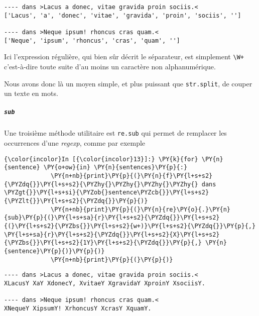     \begin{Verbatim}[commandchars=\\\{\},frame=single,framerule=0.3mm,rulecolor=\color{cellframecolor}]
---- dans >Lacus a donec, vitae gravida proin sociis.<
['Lacus', 'a', 'donec', 'vitae', 'gravida', 'proin', 'sociis', '']

---- dans >Neque ipsum! rhoncus cras quam.<
['Neque', 'ipsum', 'rhoncus', 'cras', 'quam', '']
\end{Verbatim}

    Ici l'expression régulière, qui bien sûr décrit le séparateur, est
simplement \texttt{\textbackslash{}W+} c'est-à-dire toute suite d'au
moins un caractère non alphanumérique.

Nous avons donc là un moyen simple, et plus puissant que
\texttt{str.split}, de couper un texte en mots.

    \hypertarget{sub}{%
\subparagraph{\texorpdfstring{\texttt{sub}}{sub}}\label{sub}}

    Une troisième méthode utilitaire est \texttt{re.sub} qui permet de
remplacer les occurrences d'une \emph{regexp}, comme par exemple

    \begin{Verbatim}[commandchars=\\\{\},frame=single,framerule=0.3mm,rulecolor=\color{cellframecolor}]
{\color{incolor}In [{\color{incolor}13}]:} \PY{k}{for} \PY{n}{sentence} \PY{o+ow}{in} \PY{n}{sentences}\PY{p}{:}
             \PY{n+nb}{print}\PY{p}{(}\PY{n}{f}\PY{l+s+s2}{\PYZdq{}}\PY{l+s+s2}{\PYZhy{}\PYZhy{}\PYZhy{}\PYZhy{} dans \PYZgt{}}\PY{l+s+si}{\PYZob{}sentence\PYZcb{}}\PY{l+s+s2}{\PYZlt{}}\PY{l+s+s2}{\PYZdq{}}\PY{p}{)}
             \PY{n+nb}{print}\PY{p}{(}\PY{n}{re}\PY{o}{.}\PY{n}{sub}\PY{p}{(}\PY{l+s+sa}{r}\PY{l+s+s2}{\PYZdq{}}\PY{l+s+s2}{(}\PY{l+s+s2}{\PYZbs{}}\PY{l+s+s2}{w+)}\PY{l+s+s2}{\PYZdq{}}\PY{p}{,} \PY{l+s+sa}{r}\PY{l+s+s2}{\PYZdq{}}\PY{l+s+s2}{X}\PY{l+s+s2}{\PYZbs{}}\PY{l+s+s2}{1Y}\PY{l+s+s2}{\PYZdq{}}\PY{p}{,} \PY{n}{sentence}\PY{p}{)}\PY{p}{)}
             \PY{n+nb}{print}\PY{p}{(}\PY{p}{)}
\end{Verbatim}


    \begin{Verbatim}[commandchars=\\\{\},frame=single,framerule=0.3mm,rulecolor=\color{cellframecolor}]
---- dans >Lacus a donec, vitae gravida proin sociis.<
XLacusY XaY XdonecY, XvitaeY XgravidaY XproinY XsociisY.

---- dans >Neque ipsum! rhoncus cras quam.<
XNequeY XipsumY! XrhoncusY XcrasY XquamY.
\end{Verbatim}

